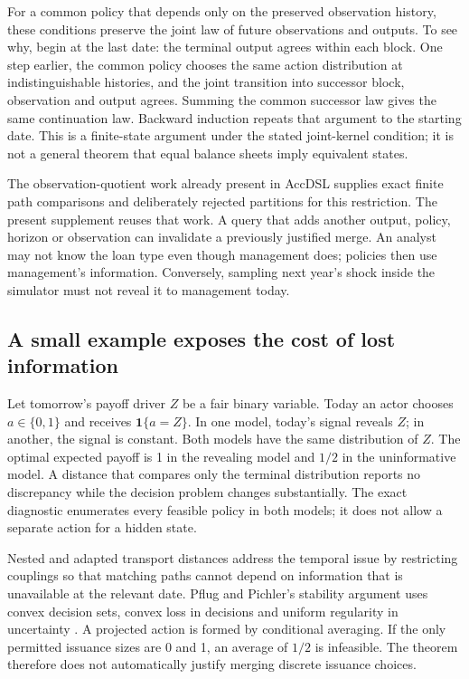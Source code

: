 \documentclass[11pt,a4paper]{article}
\newcommand{\ind}{\mathbf 1}
\begin{document}
For a common policy that depends only on the preserved observation history,
these conditions preserve the joint law of future observations and outputs.
To see why, begin at the last date: the terminal output agrees within each
block. One step earlier, the common policy chooses the same action distribution
at indistinguishable histories, and the joint transition into successor block,
observation and output agrees. Summing the common successor law gives the same
continuation law. Backward induction repeats that argument to the starting
date. This is a finite-state argument under the stated joint-kernel condition;
it is not a general theorem that equal balance sheets imply equivalent states.

The observation-quotient work already present in AccDSL supplies exact finite
path comparisons and deliberately rejected partitions for this restriction.
The present supplement reuses that work. A query that adds another output,
policy, horizon or observation can invalidate a previously justified merge.
An analyst may not know the loan type even though management does; policies
then use management's information. Conversely, sampling next year's shock
inside the simulator must not reveal it to management today.

\subsection{A small example exposes the cost of lost information}
Let tomorrow's payoff driver $Z$ be a fair binary variable. Today an actor
chooses $a\in\{0,1\}$ and receives $\ind\{a=Z\}$. In one model, today's
signal reveals $Z$; in another, the signal is constant. Both models have the
same distribution of $Z$. The optimal expected payoff is 1 in the revealing
model and $1/2$ in the uninformative model. A distance that compares only the
terminal distribution reports no discrepancy while the decision problem
changes substantially. The exact diagnostic enumerates every feasible policy
in both models; it does not allow a separate action for a hidden state.

Nested and adapted transport distances address the temporal issue by
restricting couplings so that matching paths cannot depend on information
that is unavailable at the relevant date. Pflug and Pichler's stability
argument uses convex decision sets, convex loss in decisions and uniform
regularity in uncertainty \cite[Definition~5.1, Theorem~6.1 and proof]{pflug}.
A projected action is formed by conditional averaging. If the only permitted
issuance sizes are 0 and 1, an average of $1/2$ is infeasible. The theorem
therefore does not automatically justify merging discrete issuance choices.
\end{document}
